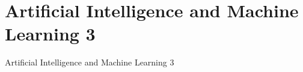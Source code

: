\documentclass{beamer}
\begin{document}
\section{Artificial Intelligence and Machine Learning 3}

{
\begin{frame}{Artificial Intelligence and Machine Learning 3}
\end{frame}

}
\end{document}
